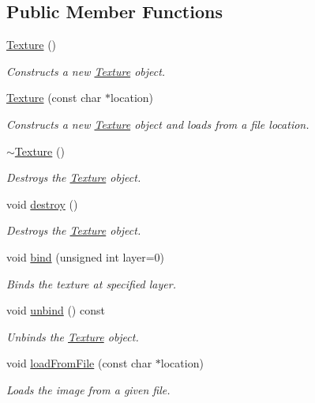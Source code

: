 \subsection*{Public Member Functions}
\begin{DoxyCompactItemize}
\item 
\hyperlink{classpcs_1_1Texture_a1f0e7c4ed23cf395b082cc5cc56497a4}{Texture} ()
\begin{DoxyCompactList}\small\item\em Constructs a new \hyperlink{classpcs_1_1Texture}{Texture} object. \end{DoxyCompactList}\item 
\hyperlink{classpcs_1_1Texture_a7d85ec721e688ee7313bd858477fbcf2}{Texture} (const char $\ast$location)
\begin{DoxyCompactList}\small\item\em Constructs a new \hyperlink{classpcs_1_1Texture}{Texture} object and loads from a file location. \end{DoxyCompactList}\item 
\hyperlink{classpcs_1_1Texture_a2267bb7d920e784a1915ae14e5b5916b}{$\sim$\+Texture} ()
\begin{DoxyCompactList}\small\item\em Destroys the \hyperlink{classpcs_1_1Texture}{Texture} object. \end{DoxyCompactList}\item 
void \hyperlink{classpcs_1_1Texture_aad31d75ae69be153300bd87e244afa54}{destroy} ()
\begin{DoxyCompactList}\small\item\em Destroys the \hyperlink{classpcs_1_1Texture}{Texture} object. \end{DoxyCompactList}\item 
void \hyperlink{classpcs_1_1Texture_a25574cca4b0d13916950f708acc3e1c9}{bind} (unsigned int layer=0)
\begin{DoxyCompactList}\small\item\em Binds the texture at specified layer. \end{DoxyCompactList}\item 
void \hyperlink{classpcs_1_1Texture_a8893d66d0d51a3d7ae8b6ec70f7076a1}{unbind} () const
\begin{DoxyCompactList}\small\item\em Unbinds the \hyperlink{classpcs_1_1Texture}{Texture} object. \end{DoxyCompactList}\item 
void \hyperlink{classpcs_1_1Texture_a7cedaff72d12b58ace397f7ef4de23f3}{load\+From\+File} (const char $\ast$location)
\begin{DoxyCompactList}\small\item\em Loads the image from a given file. \end{DoxyCompactList}\end{DoxyCompactItemize}
